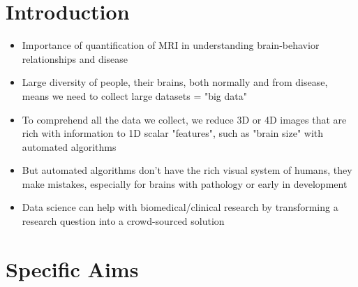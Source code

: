 \section{Introduction}
\begin{itemize}
\item Importance of quantification of MRI in understanding brain-behavior relationships and disease
\item Large diversity of people, their brains, both normally and from disease, means we need to collect large datasets = "big data"
\item To comprehend all the data we collect, we reduce 3D or 4D images that are rich with information to 1D scalar "features", such as "brain size" with automated algorithms
\item But automated algorithms don't have the rich visual system of humans, they make mistakes, especially for brains with pathology or early in development
\item Data science can help with biomedical/clinical research by transforming a research question into a crowd-sourced solution
\end{itemize}

\section{Specific Aims}
